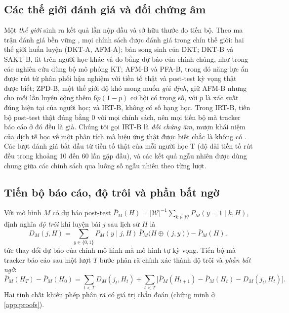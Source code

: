 \documentclass[a4paper,preprint,12pt,authoryear]{elsarticle}
\begin{document}
\subsection{Các thế giới đánh giá và đối chứng âm}\label{sec:worlds}

Một \emph{thế giới} sinh ra kết quả lần nộp đầu và sở hữu thước đo tiến bộ. Theo ma trận đánh giá bền vững \citep{doroudi2017rem}, mọi chính sách được đánh giá trong chín thế giới: hai thế giới huấn luyện (DKT-A, AFM-A); bản song sinh của DKT; DKT-B và SAKT-B, fit trên người học khác và đo bằng dự báo của chính chúng, như trong các nghiên cứu dùng bộ mô phỏng KT; AFM-B và PFA-B, trong đó năng lực ẩn được rút từ phân phối hậu nghiệm với tiền tố thật và post-test kỳ vọng thật được biết; ZPD-B, một thế giới độ khó mong muốn \emph{giả định}, giữ AFM-B nhưng cho mỗi lần luyện cộng thêm $6p(1-p)$ cơ hội có trọng số, với $p$ là xác suất đúng hiện tại của người học; và IRT-B, không có số hạng học. Trong IRT-B, tiến bộ post-test thật đúng bằng 0 với mọi chính sách, nên mọi tiến bộ mà tracker báo cáo ở đó đều là giả. Chúng tôi gọi IRT-B là \emph{đối chứng âm}, mượn khái niệm của dịch tễ học về một phân tích mà hiệu ứng thật được biết chắc là không có \citep{lipsitch2010negative,arnold2016negative}. Các lượt đánh giá bắt đầu từ tiền tố thật của mỗi người học T (độ dài tiền tố rút đều trong khoảng 10 đến 60 lần gặp đầu), và các kết quả ngẫu nhiên được dùng chung giữa các chính sách qua luồng số ngẫu nhiên theo từng lượt.

\subsection{Tiến bộ báo cáo, độ trôi và phần bất ngờ}\label{sec:drift}

Với mô hình $M$ có dự báo post-test $\bar P_M(H)=|\mathcal W|^{-1}\sum_{k\in\mathcal W}P_M(y=1\mid k,H)$, định nghĩa \emph{độ trôi} khi luyện bài $j$ sau lịch sử $H$ là
\begin{equation}
D_M(j,H) = \sum_{y\in\{0,1\}} P_M(y\mid j,H)\,\bar P_M\bigl(H\oplus(j,y)\bigr) - \bar P_M(H),
\label{eq:drift}
\end{equation}
tức thay đổi dự báo của chính mô hình mà mô hình tự kỳ vọng. Tiến bộ mà tracker báo cáo sau một lượt $T$ bước phân rã chính xác thành độ trôi và \emph{phần bất ngờ}:
\begin{equation}
\bar P_M(H_{T}) - \bar P_M(H_0) = \sum_{t<T} D_M(j_t,H_t) + \sum_{t<T} \bigl[\bar P_M(H_{t+1}) - \bar P_M(H_t) - D_M(j_t,H_t)\bigr].
\label{eq:decomposition}
\end{equation}
Hai tính chất khiến phép phân rã có giá trị chẩn đoán (chứng minh ở \ref{app:proofs}).
\end{document}
